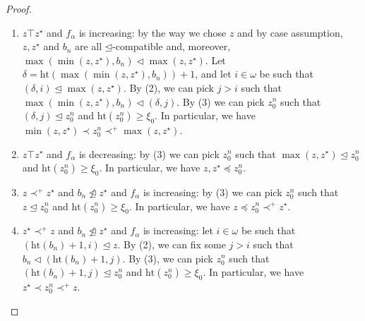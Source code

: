 \documentclass[10pt,a4paper]{amsart}
\begin{document}
\begin{proof}

\begin{enumerate}[label={(\roman*)}]
\itemsep0.3em
\item $z \top z^\star$ and $f_\alpha$ is increasing:
\newline by the way we chose $z$ and by case assumption, $z,z^\star$ and $b_n$ are all $\unlhd$-compatible and, moreover, $\max(\min(z,z^\star), b_n) \lhd \max(z,z^\star)$. Let $\delta = \mathrm{ht}(\max(\min(z, z^\star), b_n))+1$, and let $i \in \omega$ be such that $(\delta, i) \unlhd \max(z, z^\star)$. By (2), we can pick $j > i$ such that $\max(\min(z, z^\star), b_n) \lhd (\delta, j)$. By (3) we can pick $z_0^n$ such that $(\delta, j) \unlhd z_0^n$ and $\mathrm{ht}(z_0^n) \ge \xi_0$. In particular, we have $\min(z,z^\star) \prec z_0^n \prec^+ \max(z, z^\star)$. 

\item $z \top z^\star$ and $f_\alpha$ is decreasing:
\newline by (3) we can pick $z_0^n$ such that $\max (z,z^\star) \unlhd z_0^n$ and $\mathrm{ht}(z_0^n) \ge \xi_0$. In particular, we have $z,z^\star \preceq z_0^n$.

\item $z \prec^+ z^\star$ and $b_n \not\trianglelefteq z^\star$ and $f_\alpha$ is increasing:
\newline by (3) we can pick $z_0^n$ such that $z \unlhd z_0^n$ and $\mathrm{ht}(z_0^n) \ge \xi_0$. In particular, we have $z \preceq z_0^n \prec^+ z^\star$.


\item $z^\star \prec^+ z$ and $b_n \not\trianglelefteq z^\star$ and $f_\alpha$ is increasing:
\newline let $i \in \omega$ be such that $(\mathrm{ht}(b_n)+1, i) \unlhd z$. By (2), we can fix some $j > i$ such that $b_n \lhd (\mathrm{ht}(b_n)+1, j)$. By (3), we can pick $z_0^n$ such that $(\mathrm{ht}(b_n)+1, j) \unlhd z_0^n$ and $\mathrm{ht}(z_0^n) \ge \xi_0$. In particular, we have $z^\star \prec z_0^n \prec^+ z$.



\end{enumerate}
\end{proof}
\end{document}
